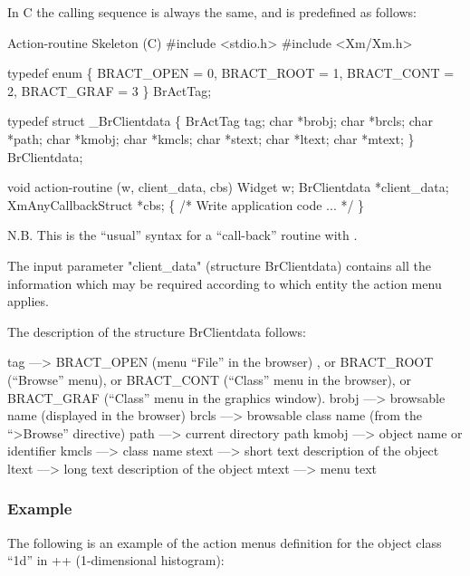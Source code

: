 In C the calling sequence is always the same, and is predefined as follows:
\begin{XMPt} {Action-routine Skeleton (C)}
#include <stdio.h>
#include <Xm/Xm.h>

typedef enum \{
  BRACT_OPEN = 0,
  BRACT_ROOT = 1,
  BRACT_CONT = 2,
  BRACT_GRAF = 3
\} BrActTag;

typedef struct _BrClientdata \{
  BrActTag    tag;
  char       *brobj;
  char       *brcls;
  char       *path;
  char       *kmobj;
  char       *kmcls;
  char       *stext;
  char       *ltext;
  char       *mtext;
\} BrClientdata;

void action-routine (w, client_data, cbs)
   Widget w;
   BrClientdata *client_data;
   XmAnyCallbackStruct *cbs;
\{
   /* Write application code ... */
\}
\end{XMPt}
N.B. This is the ``usual'' syntax for a ``call-back'' routine with \Motif{}.

The input parameter "client\_data" (structure BrClientdata) contains all 
the information which may be required according to which entity the action 
menu applies. 

The description of the structure BrClientdata follows:
\begin{XMP}
  tag   ---> BRACT_OPEN (menu ``File'' in the browser) , 
             or BRACT_ROOT (``Browse'' menu), 
             or BRACT_CONT (``Class'' menu in the browser),
             or BRACT_GRAF (``Class'' menu in the graphics window).
  brobj ---> browsable name (displayed in the browser)
  brcls ---> browsable class name (from the ``>Browse'' directive)
  path  ---> current directory path
  kmobj ---> object name or identifier
  kmcls ---> class name
  stext ---> short text description of the object
  ltext ---> long text description of the object
  mtext ---> menu text
\end{XMP}

\subsubsection{Example}

The following is an example of the action menus definition for the object
class ``1d'' in \PAW++{} (1-dimensional histogram):

